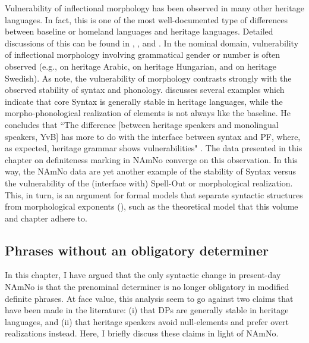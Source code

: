 \documentclass[output=paper]{langscibook}
\begin{document}
Vulnerability of inflectional morphology has been observed in many other heritage languages. In fact, this is one of the most well-documented type of differences between baseline or homeland languages and heritage languages. Detailed discussions of this can be found in \citet[54--71]{Montrul2016}, \citet[chapter 5]{Polinsky2018}, and \citet{PutnamSchwarzHoffman2021}. In the nominal domain, vulnerability of inflectional morphology involving grammatical gender or number is often observed (e.g., \citealt{AlbiriniEtAl2011, BenmamounEtAl2014} on heritage Arabic, \citealt{Bolonyai2007} on heritage Hungarian, and \citealt{Haakansson1995} on heritage Swedish). As \citet[614]{PutnamSchwarzHoffman2021} note, the vulnerability of morphology contrasts strongly with the observed stability of syntax and phonology. \citet{Benmamoun2021} discusses several examples which indicate that core Syntax is generally stable in heritage languages, while the morpho-phonological realization of elements is not always like the baseline. He concludes that ``The difference [between heritage speakers and monolingual speakers, YvB] has more to do with the interface between syntax and PF, where, as expected, heritage grammar shows vulnerabilities" \citep[393]{Benmamoun2021}. The data presented in this chapter on definiteness marking in NAmNo converge on this observation. In this way, the NAmNo data are yet another example of the stability of Syntax versus the vulnerability of the (interface with) Spell-Out or morphological realization. This, in turn, is an argument for formal models that separate syntactic structures from morphological exponents (\citealt{Lohndal2021, PutnamSchwarzHoffman2021}), such as the theoretical model that this volume and chapter adhere to.

\subsection{Phrases without an obligatory determiner} \label{PhrasesNoDet}
In this chapter, I have argued that the only syntactic change in present-day NAmNo is that the prenominal determiner is no longer obligatory in modified definite phrases. At face value, this analysis seem to go against two claims that have been made in the literature: (i) that DPs are generally stable in heritage languages, and (ii) that heritage speakers avoid null\hyp elements and prefer overt realizations instead. Here, I briefly discuss these claims in light of NAmNo.
\end{document}
